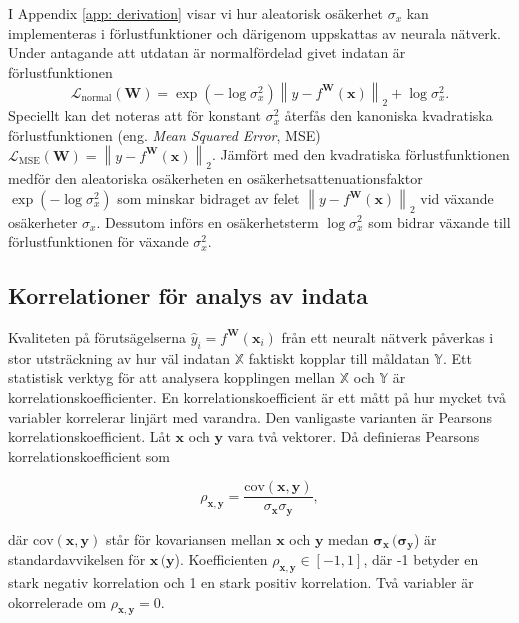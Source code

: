 I Appendix \ref{app: derivation} visar vi hur aleatorisk osäkerhet $\sigma_x$ kan implementeras i förlustfunktioner och därigenom uppskattas av neurala nätverk. Under antagande att utdatan är normalfördelad givet indatan är förlustfunktionen
\begin{equation}
    \mathcal{L}_{\mathrm{normal}}(\mathbf{W}) = \exp{\left(-\log \sigma_x^2 \right)} \left\|y - f^\mathbf{W}(\mathbf{x})\right\|_2 + \log \sigma_x^2.
    \label{eq:loss_fcn}
\end{equation}
Speciellt kan det noteras att för konstant $\sigma_x^2$ återfås den kanoniska kvadratiska förlustfunktionen (eng. \emph{Mean Squared Error}, MSE) $\mathcal{L}_\mathrm{MSE}(\mathbf{W}) = \left\|y - f^\mathbf{W}(\mathbf{x})\right\|_2$. Jämfört med den kvadratiska förlustfunktionen medför den aleatoriska osäkerheten en osäkerhetsattenuationsfaktor $\exp{\left(-\log \sigma_x^2 \right)}$ som minskar bidraget av felet $\left\|y - f^\mathbf{W}(\mathbf{x})\right\|_2$ vid växande osäkerheter $\sigma_x$. Dessutom införs en osäkerhetsterm $\log \sigma_x^2$ som bidrar växande till förlustfunktionen för växande $\sigma_x^2$.

\subsection{Korrelationer för analys av indata}
\label{sec:korre}
Kvaliteten på förutsägelserna $\hat{y}_i = f^\mathbf{W}(\mathbf{x}_i)$ från ett neuralt nätverk påverkas i stor utsträckning av hur väl indatan $\mathbb{X}$ faktiskt kopplar till måldatan $\mathbb{Y}$. Ett statistisk verktyg för att analysera kopplingen mellan $\mathbb{X}$ och $\mathbb{Y}$ är korrelationskoefficienter. En korrelationskoefficient är ett mått på hur mycket två variabler korrelerar linjärt med varandra. Den vanligaste varianten är Pearsons korrelationskoefficient. Låt $\mathbf{x}$ och $\mathbf{y}$ vara två vektorer. Då definieras Pearsons korrelationskoefficient som \cite{ProbStat}

\begin{equation}
    \rho_{\mathbf{x},\mathbf{y}} = \frac{\text{cov}(\mathbf{x,y})}{\sigma_\mathbf{x}\sigma_\mathbf{y}},
\end{equation}

\noindent
där $\text{cov}(\mathbf{x,y})$ står för kovariansen mellan $\mathbf{x}$ och $\mathbf{y}$ medan $\mathbf{\sigma}_\mathbf{x} \, (\mathbf{\sigma}_\mathbf{y}$) är standardavvikelsen för $\mathbf{x} \, (\mathbf{y}$). Koefficienten $\rho_{\mathbf{x},\mathbf{y}} \in [-1,1]$, där -1 betyder en stark negativ korrelation och 1 en stark positiv korrelation. Två variabler är okorrelerade om $\rho_{\mathbf{x},\mathbf{y}} = 0$. 

